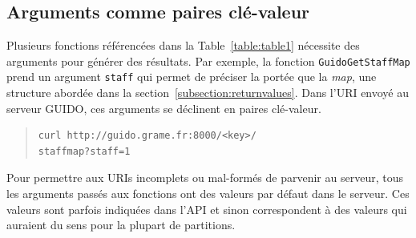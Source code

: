 \documentclass{article}
\newcommand{\guidosize}{7pt}
\begin{document}
\subsection{Arguments comme paires clé-valeur}
Plusieurs fonctions référencées dans la Table~\ref{table:table1} nécessite des arguments pour générer des résultats. Par exemple, la fonction \verb=GuidoGetStaffMap= prend un argument \verb=staff= qui permet de préciser la portée que la \emph{map}, une structure abordée dans la section~\ref{subsection:returnvalues}. Dans l'URI envoyé au serveur GUIDO, ces arguments se déclinent en paires clé-valeur.
\begin{quote}
\begingroup
\fontsize{\guidosize}{12pt}\selectfont
\begin{verbatim}
curl http://guido.grame.fr:8000/<key>/
staffmap?staff=1
\end{verbatim}
\endgroup
\end{quote}
Pour permettre aux URIs incomplets ou mal-formés de parvenir au serveur, tous les arguments passés aux fonctions ont des valeurs par défaut dans le serveur. Ces valeurs sont parfois indiquées dans l'API et sinon correspondent à des valeurs qui auraient du sens pour la plupart de partitions.
\end{document}
